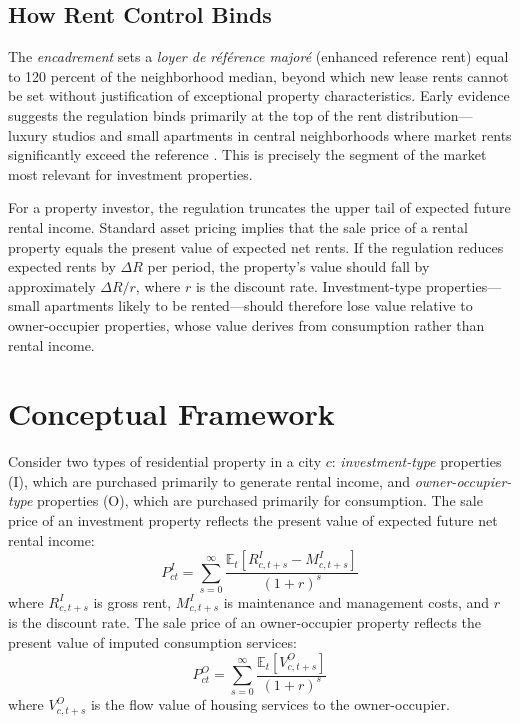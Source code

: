 \documentclass[12pt]{article}
\newcommand{\E}{\mathbb{E}}
\begin{document}
\subsection{How Rent Control Binds}

The \emph{encadrement} sets a \emph{loyer de r\'ef\'erence major\'e} (enhanced reference rent) equal to 120 percent of the neighborhood median, beyond which new lease rents cannot be set without justification of exceptional property characteristics. Early evidence suggests the regulation binds primarily at the top of the rent distribution---luxury studios and small apartments in central neighborhoods where market rents significantly exceed the reference \citep{bonnefoy2021encadrement}. This is precisely the segment of the market most relevant for investment properties.

For a property investor, the regulation truncates the upper tail of expected future rental income. Standard asset pricing implies that the sale price of a rental property equals the present value of expected net rents. If the regulation reduces expected rents by $\Delta R$ per period, the property's value should fall by approximately $\Delta R / r$, where $r$ is the discount rate. Investment-type properties---small apartments likely to be rented---should therefore lose value relative to owner-occupier properties, whose value derives from consumption rather than rental income.

\section{Conceptual Framework}

Consider two types of residential property in a city $c$: \emph{investment-type} properties (I), which are purchased primarily to generate rental income, and \emph{owner-occupier-type} properties (O), which are purchased primarily for consumption. The sale price of an investment property reflects the present value of expected future net rental income:
\begin{equation}
P^I_{ct} = \sum_{s=0}^{\infty} \frac{\E_t[R^I_{c,t+s} - M^I_{c,t+s}]}{(1+r)^s}
\label{eq:pv_invest}
\end{equation}
where $R^I_{c,t+s}$ is gross rent, $M^I_{c,t+s}$ is maintenance and management costs, and $r$ is the discount rate. The sale price of an owner-occupier property reflects the present value of imputed consumption services:
\begin{equation}
P^O_{ct} = \sum_{s=0}^{\infty} \frac{\E_t[V^O_{c,t+s}]}{(1+r)^s}
\label{eq:pv_owner}
\end{equation}
where $V^O_{c,t+s}$ is the flow value of housing services to the owner-occupier.
\end{document}

